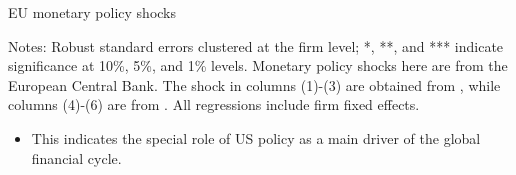 \documentclass[10pt]{beamer}
\begin{document}
\begin{frame}{EU monetary policy shocks}
\begin{table}[htbp]
{\begin{threeparttable}
\begin{tablenotes}
            \item Notes: Robust standard errors clustered at the firm level;  *, **, and *** indicate significance at 10\%, 5\%, and 1\% levels. Monetary policy shocks here are from the European Central Bank. The shock in columns (1)-(3) are obtained from \cite{miranda2022tale}, while columns (4)-(6) are  from \cite{jarocinski2020deconstructing}. All regressions include firm fixed effects.
    	\end{tablenotes}
        \end{threeparttable}
        }
        \label{tab.EU}
    \end{table}
    \begin{itemize}
        \item This indicates the special role of US policy as a main driver of the global financial cycle.
    \end{itemize}
\end{frame}
\end{document}
